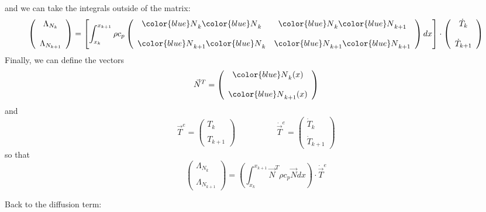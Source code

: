 and we can take the integrals outside of the matrix:
\[
\left(
\begin{array}{c}
{\Lambda}_{N_k} \\ \\ {\Lambda}_{N_{k+1}}
\end{array}
\right)
=
\left[
\int_{x_k}^{x_{k+1}}
\rho c_p
\left(
\begin{array}{cc}
{\color{blue}N}_k {\color{blue}N}_{k}     &  {\color{blue}N}_k {\color{blue}N}_{k+1}  \\ \\
{\color{blue}N}_{k+1} {\color{blue}N}_{k} &  {\color{blue}N}_{k+1} {\color{blue}N}_{k+1} 
\end{array}
\right)
dx
\right]
\cdot
\left(
\begin{array}{c}
\dot{T}_k \\ \\ 
\dot{T}_{k+1}
\end{array}
\right)
\]
Finally, we can define the vectors 
\[
{\vec N}^T = 
\left(
\begin{array}{c}
{\color{blue}N}_k(x)  \\ \\  {\color{blue}N}_{k+1} (x)
\end{array}
\right)
\]
and 
\[
{\vec T}^e = 
\left(
\begin{array}{c}
T_k \\ \\ T_{k+1}
\end{array}
\right)
\quad
\quad
\quad
\quad
\quad
\dot{\vec T}^e = 
\left(
\begin{array}{c}
\dot{T}_k \\ \\ \dot{T}_{k+1}
\end{array}
\right)
\]
so that 
\[
\left(
\begin{array}{c}
{\Lambda}_{N_k} \\  \\ {\Lambda}_{N_{k+1}}
\end{array}
\right)
=
\left( \int_{x_k}^{x_{k+1}}   {\vec N}^T \rho c_p  {\vec N} dx  \right) \cdot \dot{\vec T}^e
\]

Back to the diffusion term:

